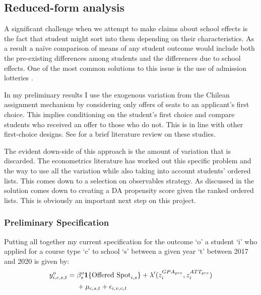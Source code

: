 \documentclass[12pt]{article}
\newcommand{\blue}[1]{\textcolor{blue}{#1}}
\begin{document}
\subsection{Reduced-form analysis}

A significant challenge when we attempt to make claims about school effects is the fact that student might sort into them depending on their characteristics. As a result a naïve comparison of means of any student outcome would include both the pre-existing differences among students and the differences due to school effects. One of the most common solutions to this issue is the use of admission lotteries \parencite{deming_better_2011, abdulkadiroglu_elite_2014, angrist_stand_2016, abdulkadiroglu_parents_2020}. 


In my preliminary results I use the exogenous variation from the Chilean assignment mechanism by considering only offers of seats to an applicant's first choice. This  implies conditioning on the student's first choice and compare students who received an offer to those who do not. This is in line with other first-choice designs. See \textcite{abdulkadiroglu_research_2017} for a brief literature review on these studies. 



The evident down-side of this approach is the amount of variation that is discarded.  The econometrics literature has worked out this specific problem and the way to use all the variation while also taking into account students' ordered lists. This comes down to a selection on observables strategy. As discussed in \textcite{abdulkadiroglu_research_2017} the solution comes down to creating a DA propensity score given the ranked ordered lists. This is obviously an important next step on this project.



\subsubsection{Preliminary Specification}

Putting all together my current specification for the outcome `o' a student `i' who applied for a course type `c' to school `s' between a given year `t' between 2017 and 2020 is given by: 
\begin{align}
y^o_{i,c,s,t} =\;&
\beta_s^o \mathbf{1}\{\text{Offered Spot}_{i,s}\} + \lambda'  (   z^{GPA_{pre}}_i , z^{ATT_{pre}}_i   )  \notag \\
&+ \mu_{c,s,t} + \epsilon_{i,v,c,t}
\end{align}
\end{document}
